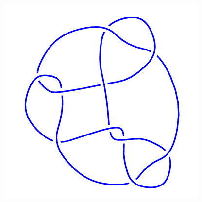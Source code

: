 \begin{figure}[H]
\begin{minipage}[b]{.18\linewidth}
	\end{minipage}
	\begin{minipage}[b]{.18\linewidth}
		\centering
		\includegraphics[width=\linewidth]{../data/10_71.png}
	\end{minipage}
\end{figure}
